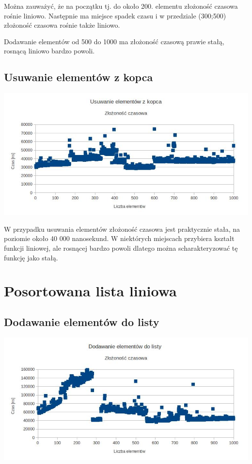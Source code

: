 \documentclass[10pt,a4paper]{article}
\begin{document}
Można zauważyć, że na początku tj. do około 200. elementu złożoność czasowa rośnie liniowo. Następnie ma miejsce spadek
czasu i w przedziale (300;500) złożoność czasowa rośnie także liniowo. 

Dodawanie elementów od 500 do 1000 ma złożoność czasową prawie stałą, rosnącą liniowo bardzo powoli.  

\subsection{Usuwanie elementów z kopca}

\includegraphics[scale=0.4]{heap_removing.jpg}

W przypadku usuwania elementów złożoność czasowa jest praktycznie stała, na poziomie około 40 000 nanosekund. W niektórych miejscach
przybiera kształt funkcji liniowej, ale rosnącej bardzo powoli dlatego można scharakteryzować tę funkcję jako stałą.

\section{Posortowana lista liniowa}

\subsection{Dodawanie elementów do listy}

\includegraphics[scale=0.4]{list_adding.jpg}
\end{document}
